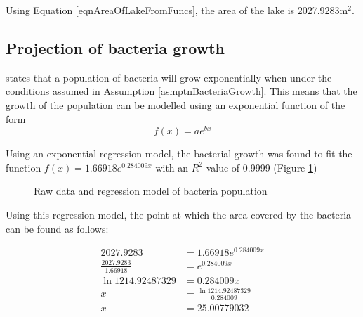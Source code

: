 \documentclass{article}
\theoremstyle{definition}
\begin{document}
        Using Equation \ref{eqnAreaOfLakeFromFuncs}, the area of the lake is 2027.9283m$^2$.


    \subsection{Projection of bacteria growth}
    
        \cite{bacteriaGrowth} states that a population of bacteria will grow exponentially when under the conditions assumed in Assumption \ref{asmptnBacteriaGrowth}. This means that the growth of the population can be modelled using an exponential function of the form 
        \begin{equation}
            f(x)=ae^{bx}
        \end{equation}

        Using an exponential regression model, the bacterial growth was found to fit the function $f(x) = 1.66918e^{0.284009x}$ with an $R^2$ value of 0.9999 (Figure \ref{figBacteriaGrowth})
        \begin{figure}
            \centering
            \caption{Raw data and regression model of bacteria population}
            \label{figBacteriaGrowth}
        \end{figure}

        Using this regression model, the point at which the area covered by the bacteria can be found as follows:
        
        \begin{align*}
            2027.9283 &= 1.66918e^{0.284009x} \\
            \frac{2027.9283}{1.66918} &= e^{0.284009x} \\
            \ln 1214.92487329 &= 0.284009x \\
            x &= \frac{\ln 1214.92487329}{0.284009} \\
            x &= 25.00779032
        \end{align*} 
\end{document}
